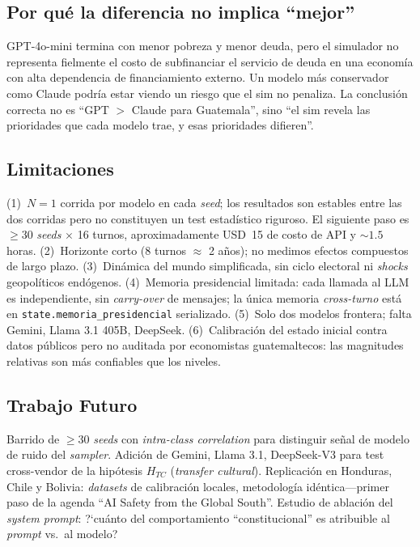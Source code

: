 \documentclass[conference]{IEEEtran}
\begin{document}
\subsection{Por qu\'e la diferencia no implica ``mejor''}

GPT-4o-mini termina con menor pobreza y menor deuda, pero el
simulador no representa fielmente el costo de subfinanciar el
servicio de deuda en una econom\'ia con alta dependencia de
financiamiento externo. Un modelo m\'as conservador como Claude
podr\'ia estar viendo un riesgo que el sim no penaliza. La
conclusi\'on correcta no es ``GPT $>$ Claude para Guatemala'', sino
``el sim revela las prioridades que cada modelo trae, y esas
prioridades difieren''.

\subsection{Limitaciones}

(1)~$N{=}1$ corrida por modelo en cada \emph{seed}; los resultados
son estables entre las dos corridas pero no constituyen un test
estad\'istico riguroso. El siguiente paso es $\geq 30$ \emph{seeds}
$\times$ 16 turnos, aproximadamente USD~15 de costo de API y
$\sim 1.5$ horas. (2)~Horizonte corto (8 turnos $\approx$ 2 a\~nos);
no medimos efectos compuestos de largo plazo. (3)~Din\'amica del
mundo simplificada, sin ciclo electoral ni \emph{shocks}
geopol\'iticos end\'ogenos. (4)~Memoria presidencial limitada: cada
llamada al LLM es independiente, sin \emph{carry-over} de mensajes;
la \'unica memoria \emph{cross-turno} est\'a en
\texttt{state.memoria\_presidencial} serializado. (5)~Solo dos
modelos frontera; falta Gemini, Llama 3.1 405B, DeepSeek.
(6)~Calibraci\'on del estado inicial contra datos p\'ublicos pero no
auditada por economistas guatemaltecos: las magnitudes relativas son
m\'as confiables que los niveles.

\subsection{Trabajo Futuro}

Barrido de $\geq 30$ \emph{seeds} con \emph{intra-class correlation}
para distinguir se\~nal de modelo de ruido del \emph{sampler}. Adici\'on
de Gemini, Llama 3.1, DeepSeek-V3 para test cross-vendor de la
hip\'otesis $H_{TC}$ (\emph{transfer cultural}). Replicaci\'on en
Honduras, Chile y Bolivia: \emph{datasets} de calibraci\'on locales,
metodolog\'ia id\'entica---primer paso de la agenda ``AI Safety from
the Global South''. Estudio de ablaci\'on del \emph{system prompt}:
?`cu\'anto del comportamiento ``constitucional'' es atribuible al
\emph{prompt} vs.\ al modelo?
\end{document}

